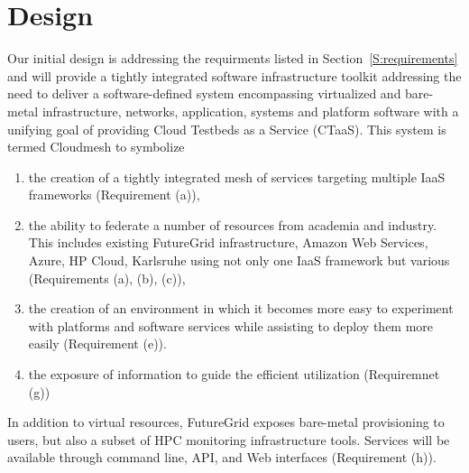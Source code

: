 \documentclass{tex/sig-alternate-2013}
\newcommand{\todo}[1]{{\color{red}{#1}}}
\begin{document}
\section{Design}\label{S:design}

\todo{READ}

Our initial design is addressing the requirments listed in
Section~\ref{S:requirements} and will provide a
tightly integrated software infrastructure toolkit addressing the need to
deliver a software-defined system encompassing virtualized and
bare-metal infrastructure, networks, application, systems and platform
software with a unifying goal of providing Cloud Testbeds as a Service
(CTaaS). This system is termed Cloudmesh to symbolize

\begin{enumerate}[leftmargin=*,itemsep=0pt,topsep=0pt]

\item the creation of a tightly integrated mesh of services targeting
  multiple IaaS frameworks (Requirement (a)), 

\item the ability to federate a number of resources from academia and
  industry. This includes existing FutureGrid infrastructure, Amazon
  Web Services, Azure, HP Cloud, Karlsruhe using not only one IaaS
  framework but various (Requirements (a), (b), (c)),

\item the creation of an environment in which it becomes more easy to
  experiment with platforms and software services while assisting to
  deploy them more easily (Requirement (e)).  

\item the exposure of information to guide the efficient utilization
  (Requiremnet (g))

\end{enumerate}

In addition to virtual resources, FutureGrid exposes bare-metal
provisioning to users, but also a subset of HPC monitoring
infrastructure tools. Services will be available through command line,
API, and Web interfaces (Requirement (h)).
\end{document}
